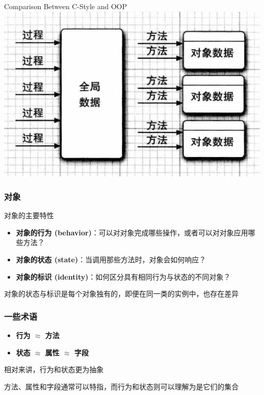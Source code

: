 \documentclass[UTF8, 16pt]{beamer}
\begin{document}
\begin{frame}
    \centering
    \textcolor{sufered}{Comparison Between C-Style and OOP}
    \includegraphics[width=0.95\linewidth]{ch2/oop.png}
\end{frame}

\begin{frame}
    \frametitle{对象}

    \textcolor{sufered}{对象的主要特性}
    \begin{itemize}
        \item \textbf{对象的行为 (behavior)}：可以对对象完成哪些操作，或者可以对对象应用哪些方法？
        \item \textbf{对象的状态 (state)}：当调用那些方法时，对象会如何响应？
        \item \textbf{对象的标识 (identity)}：如何区分具有相同行为与状态的不同对象？
    \end{itemize}

    \textcolor{sufered}{对象的状态与标识是每个对象独有的，即便在同一类的实例中，也存在差异}
\end{frame}

\begin{frame}
    \frametitle{一些术语}

    \begin{itemize}
        \item \textbf{行为 $\approx$ 方法}
        \item \textbf{状态 $\approx$ 属性 $\approx$ 字段}
    \end{itemize}
    \textcolor{sufered}{相对来讲，行为和状态更为抽象}
    
    方法、属性和字段通常可以特指，而行为和状态则可以理解为是它们的集合
\end{frame}
\end{document}

